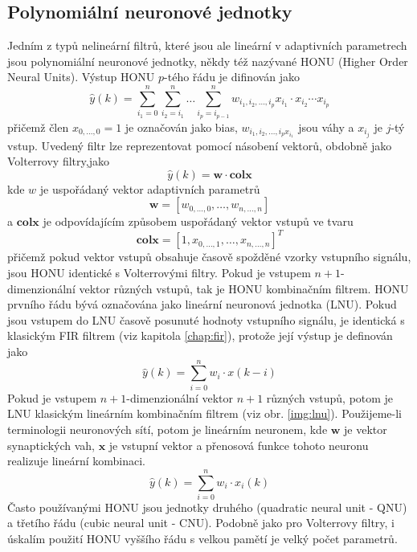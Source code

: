 \subsection{Polynomiální neuronové jednotky}\label{chap:honu}
Jedním z typů nelineární filtrů, které jsou ale lineární v adaptivních parametrech jsou polynomiální neuronové jednotky, někdy též nazývané HONU (Higher Order Neural Units). Výstup HONU $p$-tého řádu je difinován jako
\begin{equation}
    \hat{y}(k)=\sum_{i_1=0}^n \sum_{i_2=i_1}^n\dots \sum_{i_p=i_{p-1}}^n w_{i_1,i_2,\dots,i_p}x_{i_1}\cdot x_{i_2} \cdots x_{i_p}
\end{equation}
přičemž člen $x_{0,\dots,0}=1$ je označován jako bias, $w_{{i_1,i_2,\dots,i_p}x_{i_1}}$ jsou váhy a $x_{i_j}$ je $j$-tý vstup. Uvedený filtr lze reprezentovat pomocí násobení vektorů, obdobně jako Volterrovy filtry,jako
\begin{equation}
    \hat{y}(k)=\textbf{w} \cdot \textbf{colx}
\end{equation}
kde $w$ je uspořádaný vektor adaptivních parametrů
\begin{equation}
    \textbf{w}=[w_{0,\dots,0},\dots, w_{n,\dots,n}]
\end{equation}
a $\textbf{colx}$ je odpovídajícím způsobem uspořádaný vektor vstupů ve tvaru
\begin{equation}
    \textbf{colx}= [1,x_{0,\dots,1},\dots,x_{n,\dots,n}]^T
\end{equation}
přičemž pokud vektor vstupů obsahuje časově spožděné vzorky vstupního signálu, jsou HONU identické s Volterrovými filtry. Pokud je vstupem $n+1$-dimenzionální vektor různých vstupů, tak je HONU kombinačním filtrem. HONU prvního řádu bývá označována jako lineární neuronová jednotka (LNU). Pokud jsou vstupem do LNU časově posunuté hodnoty vstupního signálu, je identická s klasickým FIR filtrem (viz kapitola \ref{chap:fir}), protože její výstup je definován jako
\begin{equation}
    \hat{y}(k)=\sum_{i=0}^n w_i \cdot x(k-i)
\end{equation}
Pokud je vstupem $n+1$-dimenzionální vektor $n+1$ různých vstupů, potom je LNU klasickým lineárním kombinačním filtrem (viz obr. \ref{img:lnu}). Použijeme-li terminologii neuronových sítí, potom je lineárním neuronem, kde $\textbf{w}$ je vektor synaptických vah, $\textbf{x}$ je vstupní vektor a přenosová funkce tohoto neuronu realizuje lineární kombinaci. 
\begin{equation}
    \hat{y}(k)=\sum_{i=0}^n w_i \cdot x_i(k)
\end{equation}
Často používanými HONU jsou jednotky druhého (quadratic neural unit - QNU) a třetího řádu (cubic neural unit - CNU). Podobně jako pro Volterrovy filtry, i úskalím použití HONU vyššího řádu s velkou pamětí je velký počet parametrů. 

